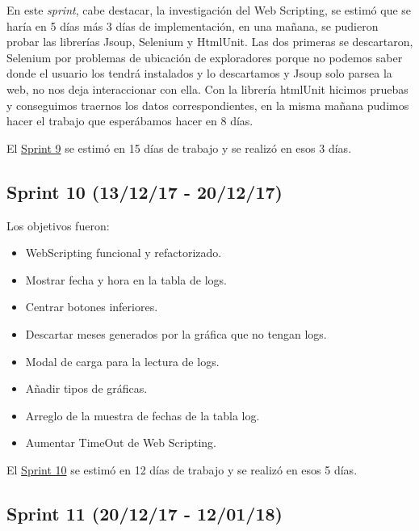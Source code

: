 En este \emph{sprint}, cabe destacar, la investigación del Web Scripting, se estimó que se haría en 5 días más 3 días de implementación, en una mañana, se pudieron probar las librerías Jsoup, Selenium y HtmlUnit. Las dos primeras se descartaron, Selenium por problemas de ubicación de exploradores porque no podemos saber donde el usuario los tendrá instalados y lo descartamos y Jsoup solo parsea la web, no nos deja interaccionar con ella. Con la librería htmlUnit hicimos pruebas y conseguimos traernos los datos correspondientes, en la misma mañana pudimos hacer el trabajo que esperábamos hacer en 8 días.

El \href{https://github.com/trona85/GII-17.1B-UBULog-1.0/milestone/9?closed=1}{Sprint 9} se estimó en 15 días de trabajo y se realizó en esos 3 días.


\subsection{Sprint 10 (13/12/17 -
	20/12/17)}\label{sprint-10-131217---201217}

Los objetivos fueron:
\begin{itemize}
	\tightlist
	\item
	WebScripting funcional y refactorizado.
	\item
	Mostrar fecha y hora en la tabla de logs.
	\item
	Centrar botones inferiores.
	\item
	Descartar meses generados por la gráfica que no tengan logs.
	\item
	Modal de carga para la lectura de logs.
	\item
	Añadir tipos de gráficas.
	\item
	Arreglo de la muestra de fechas de la tabla log.
	\item
	Aumentar TimeOut de Web Scripting.
	
\end{itemize}

El \href{https://github.com/trona85/GII-17.1B-UBULog-1.0/milestone/10?closed=1}{Sprint 10} se estimó en 12 días de trabajo y se realizó en esos 5 días.


\subsection{Sprint 11 (20/12/17 -
	12/01/18)}\label{sprint-11-201217---120118}

